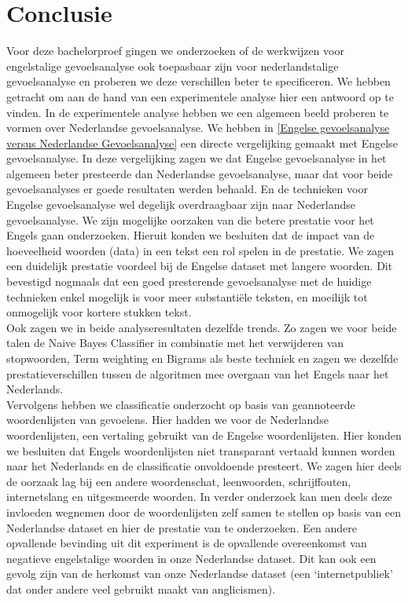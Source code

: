 \chapter{Conclusie}\label{Conclusie}

Voor deze bachelorproef gingen we onderzoeken of de werkwijzen voor engelstalige gevoelsanalyse ook toepasbaar zijn voor nederlandstalige gevoelsanalyse en proberen we deze verschillen beter te specificeren. We hebben getracht om aan de hand van een experimentele analyse hier een antwoord op te vinden.
In de experimentele analyse hebben we een algemeen beeld proberen te vormen over Nederlandse gevoelsanalyse. We hebben in \ref{Engelse gevoelsanalyse versus Nederlandse Gevoelsanalyse} een directe vergelijking gemaakt met Engelse gevoelsanalyse. In deze vergelijking zagen we dat Engelse gevoelsanalyse in het algemeen beter presteerde dan Nederlandse gevoelsanalyse, maar dat voor beide gevoelsanalyses er goede resultaten werden behaald. En de technieken voor Engelse gevoelsanalyse wel degelijk overdraagbaar zijn naar Nederlandse gevoelsanalyse. We zijn mogelijke oorzaken van die betere prestatie voor het Engels gaan onderzoeken. Hieruit konden we besluiten dat de impact van de hoeveelheid woorden (data) in een tekst een rol spelen in de prestatie. We zagen een duidelijk prestatie voordeel bij de Engelse dataset met langere woorden. Dit bevestigd nogmaals dat een goed presterende gevoelsanalyse met de huidige technieken enkel mogelijk is voor meer substanti\"ele teksten, en moeilijk tot onmogelijk voor kortere stukken tekst.\\
Ook zagen we in beide analyseresultaten dezelfde trends. Zo zagen we voor beide talen de Naive Bayes Classifier in combinatie met het verwijderen van stopwoorden, Term weighting en Bigrams als beste techniek en zagen we dezelfde prestatieverschillen tussen de algoritmen mee overgaan van het Engels naar het Nederlands.\\

Vervolgens hebben we classificatie onderzocht op basis van geannoteerde woordenlijsten van gevoelens. Hier hadden we voor de Nederlandse woordenlijsten, een vertaling gebruikt van de Engelse woordenlijsten. Hier konden we besluiten dat Engels woordenlijsten niet transparant vertaald kunnen worden naar het Nederlands en de classificatie onvoldoende presteert. We zagen hier deels de oorzaak lag bij een andere woordenschat, leenwoorden, schrijffouten, internetslang en uitgesmeerde woorden. In verder onderzoek kan men deels deze invloeden wegnemen door de woordenlijsten zelf samen te stellen op basis van een Nederlandse dataset en hier de prestatie van te onderzoeken. Een andere opvallende bevinding uit dit experiment is de opvallende overeenkomst van negatieve engelstalige woorden in onze Nederlandse dataset. Dit kan ook een gevolg zijn van de herkomst van onze Nederlandse dataset (een ‘internetpubliek’ dat onder andere veel gebruikt maakt van anglicismen).\\

